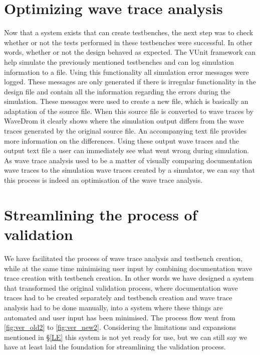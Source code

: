 \section{Optimizing wave trace analysis}
Now that a system exists that can create testbenches, the next step was to check whether or not the tests performed in these testbenches were successful. In other words, whether or not the design behaved as expected.
\npar
The VUnit framework can help simulate the previously mentioned testbenches and can log simulation information to a file. Using this functionality all simulation error messages were logged. These messages are only generated if there is irregular functionality in the design file and contain all the information regarding the errors during the simulation. These messages were used to create a new file, which is basically an adaptation of the source file. When this source file is converted to wave traces by WaveDrom it clearly shows where the simulation output differs from the wave traces generated by the original source file. An accompanying text file provides more information on the differences. Using these output wave traces and the output text file a user can immediately see what went wrong during simulation.
\npar
As wave trace analysis used to be a matter of visually comparing documentation wave traces to the simulation wave traces created by a simulator, we can say that this process is indeed an optimisation of the wave trace analysis.
\section{Streamlining the process of validation}
We have facilitated the process of wave trace analysis and testbench creation, while at the same time minimising user input by combining documentation wave trace creation with testbench creation. In other words we have designed a system that transformed the original validation process, where documentation wave traces had to be created separately and testbench creation and wave trace analysis had to be done manually, into a system where these things are automated and user input has been minimised. The process flow went from \ref{fig:ver_old2} to \ref{fig:ver_new2}.
\npar
Considering the limitations and expansions mentioned in §\ref{LE} this system is not yet ready for use, but we can still say we have at least laid the foundation for streamlining the validation process.\newpage%
%
\npar
{}%
\restoregeometry
